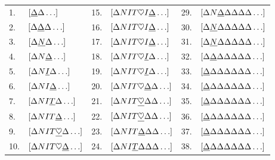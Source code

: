 \documentclass[a4paper,11pt]{article}[24.3.2010]
\begin{document}
\begin{enumerate}
\begin{table}[ht]
\begin{center}
\begin{tabular}{ l  l  l  l  l  l }
        1.& $[\textcolor{black}{\underline{\Delta}}\Delta\ldots]$ & 15.& $[\Delta NIT\heartsuit I \textcolor{black}{\underline{\Delta}}\ldots]$ & 29.& $[\Delta N\textcolor{black}{\underline{\Delta}}\Delta\Delta\Delta\Delta\ldots]$\\
        2.& $[\Delta\textcolor{black}{\underline{\Delta}}\Delta\ldots]$ & 16.& $[\Delta NIT\heartsuit I \textcolor{black}{\underline{\Delta}}\ldots]$ & 30.& $[\Delta \textcolor{black}{\underline{N}}\Delta\Delta\Delta\Delta\Delta\ldots]$\\
        3.& $[\Delta\textcolor{black}{\underline{N}}\Delta\ldots]$ & 17.& $[\Delta NIT\heartsuit I \textcolor{black}{\underline{\Delta}}\ldots]$ & 31.& $[\Delta \textcolor{black}{\underline{N}}\Delta\Delta\Delta\Delta\Delta\ldots]$\\
        4.& $[\Delta N\textcolor{black}{\underline{\Delta}}\ldots]$ & 18.& $[\Delta NIT\heartsuit\textcolor{black}{\underline{I}}\Delta\ldots]$ & 32.& $[\Delta \textcolor{black}{\underline{\Delta}}\Delta\Delta\Delta\Delta\Delta\ldots]$\\
        5.& $[\Delta N\textcolor{black}{\underline{I}}\Delta\ldots]$ & 19.& $[\Delta NIT\heartsuit\textcolor{black}{\underline{I}}\Delta\ldots]$ & 33.& $[\textcolor{black}{\underline{\Delta}}\Delta\Delta\Delta\Delta\Delta\Delta\ldots]$\\
         6.& $[\Delta NI\textcolor{black}{\underline{\Delta}}\ldots]$ & 20.& $[\Delta NIT\heartsuit\textcolor{black}{\underline{\Delta}}\Delta\ldots]$ & 34.& $[\textcolor{black}{\underline{\Delta}}\Delta\Delta\Delta\Delta\Delta\Delta\ldots]$\\
        7.& $[\Delta NI\textcolor{black}{\underline{T}}\Delta\ldots]$ & 21.& $[\Delta NIT\textcolor{black}{\underline{\heartsuit}}\Delta\Delta\ldots]$ & 35.& $[\textcolor{black}{\underline{\Delta}}\Delta\Delta\Delta\Delta\Delta\Delta\ldots]$\\
        8.& $[\Delta NIT\textcolor{black}{\underline{\Delta}}\ldots]$ & 22.& $[\Delta NIT\textcolor{black}{\underline{\heartsuit}}\Delta\Delta\ldots]$ & 36.& $[\textcolor{black}{\underline{\Delta}}\Delta\Delta\Delta\Delta\Delta\Delta\ldots]$\\
       9.& $[\Delta NIT\textcolor{black}{\underline{\heartsuit}}\Delta\ldots]$ & 23.& $[\Delta NIT\textcolor{black}{\underline{\Delta}}\Delta\Delta\ldots]$ & 37.& $[\textcolor{black}{\underline{\Delta}}\Delta\Delta\Delta\Delta\Delta\Delta\ldots]$\\
        10.& $[\Delta NIT\heartsuit\textcolor{black}{\underline{\Delta}}\ldots]$ &24.& $[\Delta NI\textcolor{black}{\underline{T}}\Delta\Delta\Delta\ldots]$ &38.& $[\textcolor{black}{\underline{\Delta}}\Delta\Delta\Delta\Delta\Delta\Delta\ldots]$\\

\end{tabular}
\end{center}
\end{table}
\end{enumerate}
\end{document}
